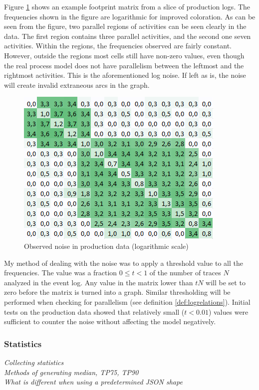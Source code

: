 \documentclass[english,12pt,a4paper,pdftex,sci,utf8]{aaltothesis}
\theoremstyle{definition}
\newcommand{\nyi}[1]{\noindent\colorbox{nyibg}{\textcolor{nyitext}{\emph{#1}}}}
\begin{document}
Figure \ref{fig:examplenoise} shows an example footprint matrix from a slice of production logs.
The frequencies shown in the figure are logarithmic for improved coloration.
As can be seen from the figure, two parallel regions of activities can be seen clearly in the data.
The first region contains three parallel activities, and the second one seven activities.
Within the regions, the frequencies observed are fairly constant.
However, outside the regions most cells still have non-zero values, even though the real process model
does not have parallelism between the leftmost and the rightmost activities.
This is the aforementioned log noise.
If left as is, the noise will create invalid extraneous arcs in the graph.

\begin{figure}[htb]
    \centering \includegraphics[width=0.6\linewidth]{gfx/noise.png}
    \caption{Observed noise in production data (logarithmic scale)}
    \label{fig:examplenoise}
\end{figure}

My method of dealing with the noise was to apply a threshold value to all the frequencies.
The value was a fraction $0 \le t < 1$ of the number of traces $N$ analyzed in the event log.
Any value in the matrix lower than $tN$ will be set to zero before the matrix is turned into a graph.
Similar thresholding will be performed when checking for parallelism (see definition \ref{def:logrelations}).
Initial tests on the production data showed that relatively small ($t < 0.01$) values were sufficient to counter the noise without affecting the model negatively.

\subsubsection{Statistics}

\nyi{Collecting statistics}\\
\nyi{Methods of generating median, TP75, TP90}\\
\nyi{What is different when using a predetermined JSON shape}
\end{document}
